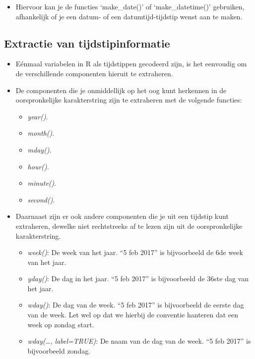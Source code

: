 \documentclass[]{memoir}
\providecommand{\tightlist}{%
  \setlength{\itemsep}{0pt}\setlength{\parskip}{0pt}}
\begin{document}
\begin{itemize}
\begin{itemize}
    \begin{itemize}
    \tightlist
    \item
      Hiervoor kan je de functies `make\_date()' of `make\_datetime()' gebruiken, afhankelijk of je een datum- of een datumtijd-tijdstip wenst aan te maken.
    \end{itemize}
  \end{itemize}
\end{itemize}

\hypertarget{extractie-van-tijdstipinformatie}{%
\subsection{Extractie van tijdstipinformatie}\label{extractie-van-tijdstipinformatie}}

\begin{itemize}
\tightlist
\item
  Eénmaal variabelen in R als tijdstippen gecodeerd zijn, is het eenvoudig om de verschillende componenten hieruit te extraheren.
\item
  De componenten die je onmiddellijk op het oog kunt herkennen in de oorspronkelijke karakterstring zijn te extraheren met de volgende functies:

  \begin{itemize}
  \tightlist
  \item
    \emph{year()}.
  \item
    \emph{month()}.
  \item
    \emph{mday()}.
  \item
    \emph{hour()}.
  \item
    \emph{minute()}.
  \item
    \emph{second()}.
  \end{itemize}
\item
  Daarnaast zijn er ook andere componenten die je uit een tijdstip kunt extraheren, dewelke niet rechtstreeks af te lezen zijn uit de oorspronkelijke karakterstring.

  \begin{itemize}
  \tightlist
  \item
    \emph{week()}: De week van het jaar. ``5 feb 2017'' is bijvoorbeeld de 6de week van het jaar.
  \item
    \emph{yday()}: De dag in het jaar. ``5 feb 2017'' is bijvoorbeeld de 36ste dag van het jaar.
  \item
    \emph{wday()}: De dag van de week. ``5 feb 2017'' is bijvoorbeeld de eerste dag van de week. Let wel op dat we hierbij de conventie hanteren dat een week op zondag start.
  \item
    \emph{wday(\ldots{}, label=TRUE)}: De naam van de dag van de week. ``5 feb 2017'' is bijvoorbeeld zondag.
  \end{itemize}
\end{itemize}
\end{document}
